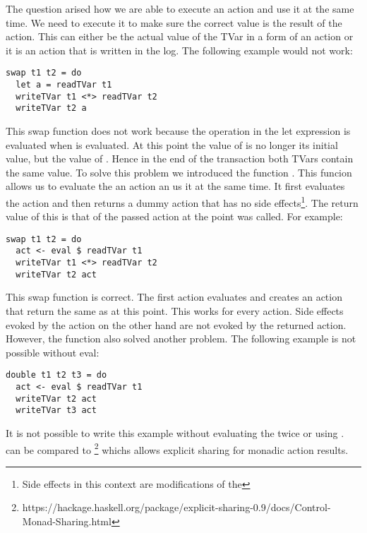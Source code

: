 The question arised how we are able to execute an action and use it at the same time. We need to execute it to make sure 
the correct value is the result of the action. This can either be the actual value of the TVar in a form of an  
action or it is an  action that is written in the log. The following example would not work:
\begin{lstlisting}
swap t1 t2 = do
  let a = readTVar t1
  writeTVar t1 <*> readTVar t2
  writeTVar t2 a
\end{lstlisting}
This swap function does not work because the  operation in the let expression is evaluated when 
 is evaluated. At this point the value of  is no longer its initial value, but the 
value of . Hence in the end of the transaction both TVars contain the same value. To solve this problem
we introduced the function . This funcion allows us to evaluate the an 
 action an us it at the same time. It first evaluates the  action and then returns a 
dummy action that has no side effects\footnote{Side effects in this context are modifications of the }. 
The return value of this is that of the passed action at the point 
was called. For example:
\begin{lstlisting}
swap t1 t2 = do
  act <- eval $ readTVar t1
  writeTVar t1 <*> readTVar t2
  writeTVar t2 act
\end{lstlisting}
This swap function is correct. The first action evaluates  and creates an action that return 
the same as  at this point. This works for every  action. Side effects evoked by the 
action on the other hand are not evoked by the returned action. However, the  function also solved another problem. The following
example is not possible without eval:
\begin{lstlisting}
double t1 t2 t3 = do 
  act <- eval $ readTVar t1
  writeTVar t2 act
  writeTVar t3 act
\end{lstlisting}
It is not possible to write this example without evaluating the  twice or using . 
 can be compared to \footnote{https://hackage.haskell.org/package/explicit-sharing-0.9/docs/Control-Monad-Sharing.html}
whichs allows explicit sharing for monadic action results.


